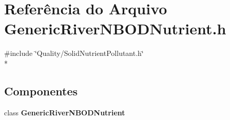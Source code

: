 \section{Referência do Arquivo Generic\+River\+N\+B\+O\+D\+Nutrient.\+h}
\label{_generic_river_n_b_o_d_nutrient_8h}
{\ttfamily \#include \char`\"{}Quality/\+Solid\+Nutrient\+Pollutant.\+h\char`\"{}}\\*
\subsection*{Componentes}
\begin{DoxyCompactItemize}
\item 
class {\bf Generic\+River\+N\+B\+O\+D\+Nutrient}
\end{DoxyCompactItemize}
